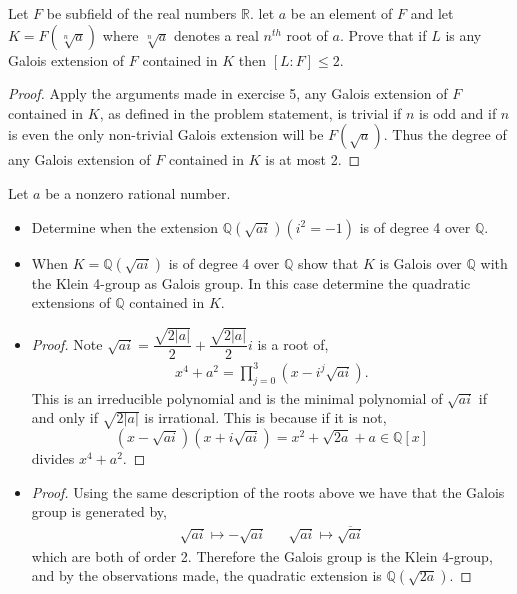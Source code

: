 \documentclass[11pt]{article}
\newenvironment{problem}[2][Problem\!]{\begin{tcolorbox}\begin{trivlist}
\item[\hskip \labelsep {\bfseries #1}\hskip \labelsep {\bfseries #2}]}{\end{trivlist}\end{tcolorbox}}
\newcommand{\qq}{\mathbb Q}   %
\newcommand{\rr}{\mathbb R}   %
\newcommand{\abs}[1]{\left\lvert#1\right\rvert} %
\renewcommand{\leq}{\leqslant}
\begin{document}
\vspace*{15pt}

\begin{problem} {14.7.13}
    Let $F$ be subfield of the real numbers $\rr$. let $a$ be an element of $F$ and let $K = F(\sqrt[n]{a})$ where $\sqrt[n]{a}$ denotes a real $n^{th}$ root of $a$. Prove that if $L$ is any Galois extension of $F$ contained in $K$ then $[L:F] \leq 2$. 
\end{problem}
\begin{proof}
    Apply the arguments made in exercise 5, any Galois extension of $F$ contained in $K$, as defined in the problem statement, is trivial if $n$ is odd and if $n$ is even the only non-trivial Galois extension will be $F(\sqrt{a})$. Thus the degree of any Galois extension of $F$ contained in $K$ is at most 2. 
\end{proof}

\vspace*{15pt}

\begin{problem} {14.7.16}
    Let $a$ be a nonzero rational number.
    \begin{itemize}
        \item[(a)] Determine when the extension $\qq(\sqrt{ai})(i^{2} = -1)$ is of degree 4 over $\qq$.
        \item[(b)] When $K = \qq(\sqrt{ai})$ is of degree 4 over $\qq$ show that $K$ is Galois over $\qq$ with the Klein 4-group as Galois group. In this case determine the quadratic extensions of $\qq$ contained in $K$. 
    \end{itemize}
\end{problem}

\begin{itemize}
    \item[(a)] \begin{proof}
        Note $\sqrt{ai} = \dfrac{\sqrt{2\abs{a}}}{2} + \dfrac{\sqrt{2\abs{a}}}{2}i$ is a root of,
        \begin{align*}
            x^{4} + a^{2} = \prod_{j=0}^{3}(x - i^{j}\sqrt{ai}). 
        \end{align*} 
        This is an irreducible polynomial and is the minimal polynomial of $\sqrt{ai}$ if and only if $\sqrt{2\abs{a}}$ is irrational. This is because if it is not,
        \[(x-\sqrt{ai})(x + i\sqrt{ai}) = x^{2} + \sqrt{2a} + a\in \qq[x]\]
        divides $x^{4} + a^{2}$.
    \end{proof} 
    \item[(b)]\begin{proof}
        Using the same description of the roots above we have that the Galois group is generated by,
        \begin{align*}
            \sqrt{ai} \mapsto -\sqrt{ai} && \sqrt{ai}\mapsto \overline{\sqrt{ai}}
        \end{align*}
        which are both of order 2. Therefore the Galois group is the Klein 4-group, and by the observations made, the quadratic extension is $\qq(\sqrt{2a})$.
        
    \end{proof}
\end{itemize}

\vspace*{15pt}
\end{document}
